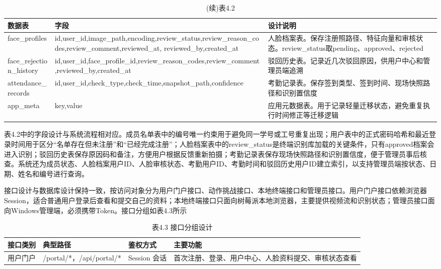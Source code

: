 \documentclass[UTF8]{heuthesis}
\begin{document}
\begingroup
\small
\begin{longtable}{|>{\raggedright\arraybackslash}p{}|>{\raggedright\arraybackslash}p{}|>{\raggedright\arraybackslash}p{}|}
\caption{(续)表4.2}\\
\hline
数据表 & 字段 & 设计说明 \\
\hline
face\_profiles & id,user\_id,image\_path,encoding,review\_status,review\_reason\_codes,review\_comment,reviewed\_at, reviewed\_by,created\_at & 人脸档案表。保存注册照路径、特征向量和审核状态。review\_status取pending、approved、rejected \\
\hline
face\_rejection\_history & id,user\_id,face\_profile\_id,review\_reason\_codes,review\_comment,reviewed\_by,created\_at & 驳回历史表。记录近几次驳回原因，供用户中心和管理员端追溯 \\
\hline
attendance\_records & id,user\_id,check\_type,check\_time,snapshot\_path,confidence & 考勤记录表。保存签到类型、签到时间、现场快照路径和识别置信度 \\
\hline
app\_meta & key,value & 应用元数据表。用于记录轻量迁移状态，避免重复执行时间修正等迁移逻辑 \\
\hline
\end{longtable}
\endgroup

表4.2中的字段设计与系统流程相对应。成员名单表中的编号唯一约束用于避免同一学号或工号重复出现；用户表中的正式密码哈希和最近登录时间用于区分“名单存在但未注册”和“已经完成注册”；人脸档案表中的review\_status是终端识别库加载的关键条件，只有approved档案会进入识别；驳回历史表保存原因码和备注，方便用户根据反馈重新拍摄；考勤记录表保存现场快照路径和识别置信度，便于管理员事后核查。系统还为成员状态、人脸档案用户ID、人脸审核状态、考勤用户ID、考勤时间和驳回历史用户ID建立索引，以支持管理员端按状态、日期、姓名和编号进行查询。

接口设计与数据库设计保持一致，按访问对象分为用户门户接口、动作挑战接口、本地终端接口和管理员接口。用户门户接口依赖浏览器Session，适合普通用户登录后查看和提交自己的资料；本地终端接口只面向树莓派本地浏览器，主要提供视频流和识别状态；管理员接口面向Windows管理端，必须携带Token。接口分组如表4.3所示

\begingroup
\small
\begin{longtable}{|>{\raggedright\arraybackslash}p{}|>{\raggedright\arraybackslash}p{}|>{\raggedright\arraybackslash}p{}|>{\raggedright\arraybackslash}p{}|}
\caption{表4.3 接口分组设计}\\
\hline
接口类别 & 典型路径 & 鉴权方式 & 主要功能 \\
\hline
用户门户 & /portal/*，/api/portal/* & Session 会话 & 首次注册、登录、用户中心、人脸资料提交、审核状态查看 \\
\hline
\end{longtable}
\endgroup
\end{document}
